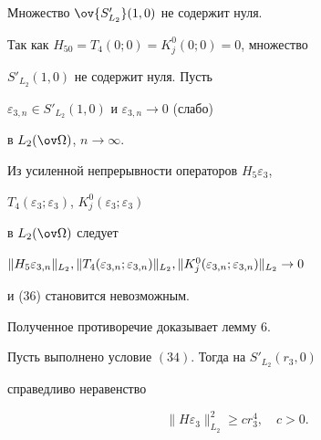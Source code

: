  


\begin{lem} Множество $\ov{S'_{L_2}}(1,0)$ не содержит нуля. 


\end{lem} 


 


\begin{pf} Так как $H_50=T_4(0;0)=K^0_j(0;0)=0$, множество 


$S'_{L_2}(1,0)$ не содержит нуля. Пусть 


$\varepsilon_{3,n}\in S'_{L_2}(1,0)$ и $\varepsilon_{3,n}\to 0$ (слабо) 


в $L_2(\ov\Omega)$, $n\to\infty$. 


Из усиленной непрерывности операторов $H_5\varepsilon_3$, 


$T_4(\varepsilon_3;\varepsilon_3)$, $K^0_j(\varepsilon_3;\varepsilon_3)$ 


в $L_2(\ov\Omega)$ следует 


$\|H_5\varepsilon_{3,n}\|_{L_2}, \|T_4(\varepsilon_{3,n}; 


\varepsilon_{3,n})\|_{L_2},\linebreak \|K^0_j(\varepsilon_{3,n}; 


\varepsilon_{3,n})\|_{L_2}\to 0$ 


и (36) становится невозможным. 


Полученное противоречие доказывает лемму 6. 


\end{pf} 


 


\begin{thm} Пусть выполнено условие $(34)$. Тогда на $S'_{L_2}(r_3,0)$ 


справедливо неравенство 


$$ 


\|H\varepsilon_3\|^2_{L_2}\ge c r^4_3,\quad c>0. 


$$ 


\end{thm} 


 



